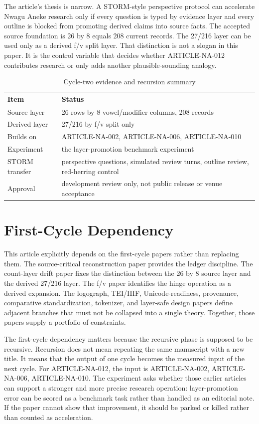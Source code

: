 \documentclass[sigconf,nonacm]{acmart}
\begin{document}
The article's thesis is narrow. A STORM-style perspective protocol can accelerate
Nwagu Aneke research only if every question is typed by evidence layer and every
outline is blocked from promoting derived claims into source facts. The accepted
source foundation is 26 by 8 equals 208 current records. The 27/216 layer can be
used only as a derived f/v split layer. That distinction is not a slogan in this
paper. It is the control variable that decides whether ARTICLE-NA-012 contributes
research or only adds another plausible-sounding analogy.


\begin{table}[t]
\caption{Cycle-two evidence and recursion summary}
\label{tab:cycle2}
\begin{tabular}{p{}p{}}
\toprule
Item & Status \\
\midrule
Source layer & 26 rows by 8 vowel/modifier columns, 208 records \\
Derived layer & 27/216 by f/v split only \\
Builds on & ARTICLE-NA-002, ARTICLE-NA-006, ARTICLE-NA-010 \\
Experiment & the layer-promotion benchmark experiment \\
STORM transfer & perspective questions, simulated review turns, outline review, red-herring control \\
Approval & development review only, not public release or venue acceptance \\
\bottomrule
\end{tabular}
\end{table}


\section{First-Cycle Dependency}
This article explicitly depends on the first-cycle papers rather than replacing
them. The source-critical reconstruction paper provides the ledger discipline.
The count-layer drift paper fixes the distinction between the 26 by 8 source
layer and the derived 27/216 layer. The f/v paper identifies the hinge operation
as a derived expansion. The logograph, TEI/IIIF, Unicode-readiness, provenance,
comparative standardization, tokenizer, and layer-safe design papers define
adjacent branches that must not be collapsed into a single theory. Together,
those papers supply a portfolio of constraints.

The first-cycle dependency matters because the recursive phase is supposed to be
recursive. Recursion does not mean repeating the same manuscript with a new
title. It means that the output of one cycle becomes the measured input of the
next cycle. For ARTICLE-NA-012, the input is ARTICLE-NA-002, ARTICLE-NA-006, ARTICLE-NA-010. The experiment asks
whether those earlier articles can support a stronger and more precise research
operation: layer-promotion error can be scored as a benchmark task rather than handled as an editorial note. If the paper cannot show that improvement, it should be
parked or killed rather than counted as acceleration.
\end{document}
